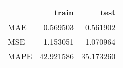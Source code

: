 \begin{tabular}{lrr}
\toprule
{} &      train &       test \\
\midrule
MAE  &   0.569503 &   0.561902 \\
MSE  &   1.153051 &   1.070964 \\
MAPE &  42.921586 &  35.173260 \\
\bottomrule
\end{tabular}
